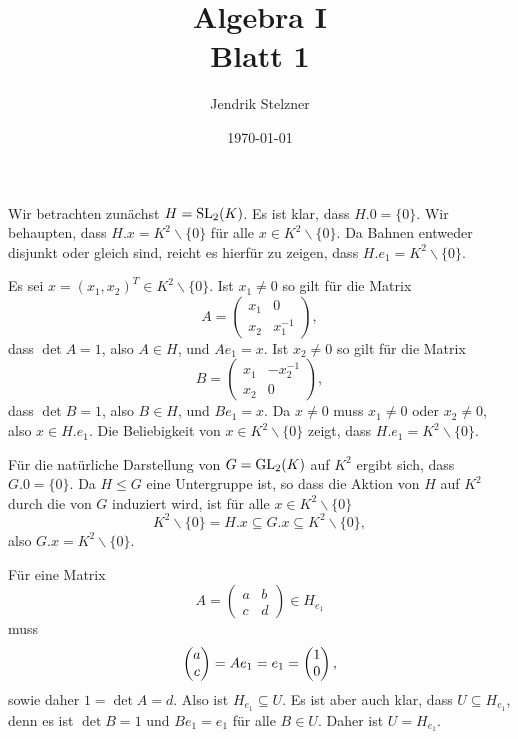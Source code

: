 \documentclass[a4paper,10pt]{article}
\title{\sc Algebra I \\ \Large Blatt 1}
\author{Jendrik Stelzner}
\date{\today}
\begin{document}
\maketitle





\section{}
Wir betrachten zunächst $H = \operatorname{SL}_2(K)$. Es ist klar, dass $H.0 = \{0\}$. Wir behaupten, dass $H.x = K^2 \smallsetminus \{0\}$ für alle $x \in K^2 \smallsetminus \{0\}$. Da Bahnen entweder disjunkt oder gleich sind, reicht es hierfür zu zeigen, dass $H.e_1 = K^2 \smallsetminus \{0\}$.

Es sei $x = (x_1,x_2)^T \in K^2 \smallsetminus \{0\}$. Ist $x_1 \neq 0$ so gilt für die Matrix
\[
 A =
 \begin{pmatrix}
  x_1 & 0 \\
  x_2 & x_1^{-1}
 \end{pmatrix},
\]
dass $\det A = 1$, also $A \in H$, und $Ae_1 = x$. Ist $x_2 \neq 0$ so gilt für die Matrix
\[
 B =
 \begin{pmatrix}
  x_1 & -x_2^{-1} \\
  x_2 & 0
 \end{pmatrix},
\]
dass $\det B = 1$, also $B \in H$, und $B e_1 = x$. Da $x \neq 0$ muss $x_1 \neq 0$ oder $x_2 \neq 0$, also $x \in H.e_1$. Die Beliebigkeit von $x \in K^2 \smallsetminus \{0\}$ zeigt, dass $H.e_1 = K^2 \smallsetminus \{0\}$.

Für die natürliche Darstellung von $G = \operatorname{GL}_2(K)$ auf $K^2$ ergibt sich, dass $G.0 = \{0\}$. Da $H \leq G$ eine Untergruppe ist, so dass die Aktion von $H$ auf $K^2$ durch die von $G$ induziert wird, ist für alle $x \in K^2 \smallsetminus\{0\}$
\[
 K^2 \smallsetminus \{0\} = H.x \subseteq G.x \subseteq K^2 \smallsetminus\{0\},
\]
also $G.x = K^2 \smallsetminus\{0\}$.

Für eine Matrix
\[
 A =
 \begin{pmatrix}
  a & b \\
  c & d
 \end{pmatrix}
 \in
 H_{e_1}
\]
muss
\[
 \begin{pmatrix}a\\c\end{pmatrix} = Ae_1 = e_1 = \begin{pmatrix}1\\0\end{pmatrix},
\]
sowie daher $1 = \det A = d$. Also ist $H_{e_1} \subseteq U$. Es ist aber auch klar, dass $U \subseteq H_{e_1}$, denn es ist $\det B = 1$ und $Be_1 = e_1$ für alle $B \in U$. Daher ist $U = H_{e_1}$.
\end{document}
